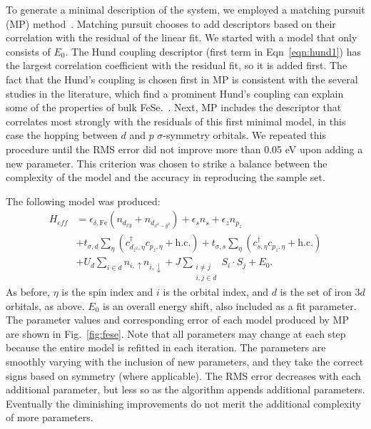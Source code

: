 To generate a minimal description of the system, we employed a matching pursuit (MP) method~\cite{MP_Zhang1993}.
Matching pursuit chooses to add descriptors based on their correlation with the residual of the linear fit. 
We started with a model that only consists of $E_0$. 
The Hund coupling descriptor (first term in Eqn~\ref{eqn:hund1}) has the largest correlation coefficient with the residual fit, so it is added first.
The fact that the Hund's coupling is chosen first in MP is consistent with the several studies in the literature, which find a prominent Hund's coupling can explain some of the properties of bulk FeSe.~\cite{demedici_hunds_2011,de_medici_janus-faced_2011,georges_strong_2013,busemeyer_competing_2016}.
Next, MP includes the descriptor that correlates most strongly with the residuals of this first minimal model, in this case the hopping between $d$ and $p$ $\sigma$-symmetry orbitals. 
We repeated this procedure until the RMS error did not improve more than 0.05 eV upon adding a new parameter.
This criterion was chosen to strike a balance between the complexity of the model and the accuracy in reproducing the sample set.

The following model was produced:
\begin{align}
  H_{eff}
  &=
  \epsilon_{\delta,\mathrm{Fe}} (n_{d_{xy}} + n_{d_{x^2-y^2}})
  +
  \epsilon_s n_{s}
  +
  \epsilon_{z} n_{p_z}
  \nonumber \\
  &+ 
  t_{\sigma,d} \sum_{\eta} \left( c_{d_{z^2},\eta}^{\dagger} c_{p_z,\eta} + \text{h.c.} \right)
  +
  t_{\sigma,s} \sum_{\eta} \left(c_{s,\eta}^{\dagger}  c_{p_z,\eta} + \text{h.c.} \right)
  \nonumber \\
  &+
  U_d \sum_{i \in d} n_{i,\uparrow} n_{i,\downarrow} 
  +
  J \sum_{\substack{i\ne j \\i,j \in d}} S_i \cdot S_j
  +
  E_0. \label{eq:fesemodel}
\end{align}
As before, $\eta$ is the spin index and $i$ is the orbital index, and $d$ is the set of iron $3d$ orbitals, as above.
$E_0$ is an overall energy shift, also included as a fit parameter.
The parameter values and corresponding error of each model produced by MP are shown in Fig.~\ref{fig:fese}.
Note that all parameters may change at each step because the entire model is refitted in each iteration.
The parameters are smoothly varying with the inclusion of new parameters, and they take the correct signs based on symmetry (where applicable). 
The RMS error decreases with each additional parameter, but less so as the algorithm appends additional parameters. 
Eventually the diminishing improvements do not merit the additional complexity of more parameters.


